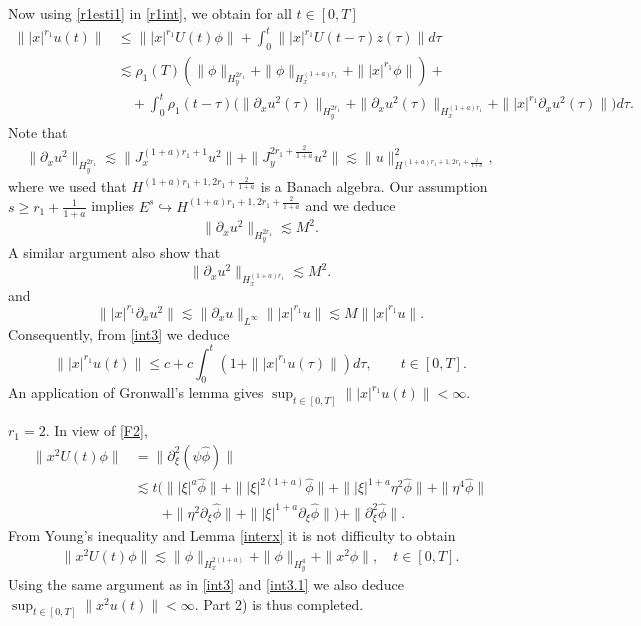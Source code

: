 \documentclass[reqno]{amsart}
\newcommand{\p}{\partial}
\numberwithin{equation}{section}
\begin{document}
 Now using \eqref{r1esti1} in \eqref{r1int}, we obtain for all $t\in [0,T]$ 
 \begin{equation}\label{int3}
 \begin{split}
\||x|^{r_1} u(t)\|&\leq \||x|^{r_1} U(t)\phi\|+\int_0^t \||x|^{r_1} U(t-\tau)z(\tau)\|d\tau\\
&\lesssim\rho_1(T)(\|\phi\|_{H^{2r_1}_y}+\|\phi\|_{H^{(1+a)r_1}_x}+\||x|^{r_1}\phi\|)+\\
&\quad+\int_0^t \rho_1(t-\tau)\big(\|\p_x u^2(\tau)\|_{H^{2r_1}_y}+\|\p_x u^2(\tau)\|_{H^{(1+a)r_1}_x}+\||x|^{r_1}\p_x u^2(\tau)\|\big)d\tau.
\end{split}
\end{equation}
Note that
\begin{equation*}
\begin{split}
\|\p_x u^2\|_{H^{2r_1}_y}\lesssim \|J_x^{(1+a)r_1+1}u^2\|+\|J_y^{2r_1+\frac{2}{1+a}}u^2\|
\lesssim \|u\|^2_{H^{(1+a)r_1+1,2r_1+\frac{2}{1+a}}},
\end{split}
\end{equation*}
where we used that $H^{(1+a)r_1+1,2r_1+\frac{2}{1+a}}$ is a Banach algebra.
Our assumption $s\geq r_1+\frac{1}{1+a}$ implies  $E^s\hookrightarrow H^{(1+a)r_1+1,2r_1+\frac{2}{1+a}}$ and we deduce  
$$
\|\p_x u^2\|_{H^{2r_1}_y}\lesssim M^2.
$$
A similar argument also show that
$$
\|\p_x u^2\|_{H^{(1+a)r_1}_x}\lesssim M^2.
$$
and
$$
\||x|^{r_1}\p_x u^2\|\lesssim \|\p_xu\|_{L^\infty}\||x|^{r_1}u\|\lesssim M\||x|^{r_1}u\|.
$$
Consequently, from \eqref{int3} we deduce
\begin{equation}\label{int3.1}
\||x|^{r_1} u(t)\|\leq c+c\int_0^t(1+\||x|^{r_1}u(\tau)\|)d\tau, \qquad t\in[0,T].
\end{equation}
An application of Gronwall's lemma gives $\sup_{t\in[0,T]}\||x|^{r_1} u(t)\|<\infty$.

 $r_1=2$. In view of \eqref{F2},
\[
\begin{split}
\|x^2U(t)\phi\|&= \|\partial_{\xi}^2(\psi\hat{\phi})\|\\
&\lesssim t\Big( \||\xi|^a\hat{\phi}\|+\||\xi|^{2(1+a)}\hat{\phi}\|+\||\xi|^{1+a}\eta^2\hat{\phi}\| +\|\eta^4\hat{\phi}\|\\
&\quad \quad +\|\eta^2\partial_{\xi}\hat{\phi}\| +\||\xi|^{1+a}\partial_{\xi}\hat{\phi}\| \Big) +\|\partial_{\xi}^2\hat{\phi}\|.
\end{split}
\]
From Young's inequality and Lemma \ref{interx} it is not difficulty to obtain
\begin{equation*}
\begin{split}
\|x^2 U(t)\phi\|\lesssim\|\phi\|_{H_x^{2(1+a)}}+\|\phi\|_{H_y^{4}}+\|x^2 \phi\|, \quad t\in[0,T].
\end{split}
\end{equation*}
Using the same argument as in \eqref{int3} and \eqref{int3.1} we also deduce $\sup_{t\in[0,T]}\|x^{2} u(t)\|<\infty$. Part 2) is thus completed.\\
 
\end{document}
